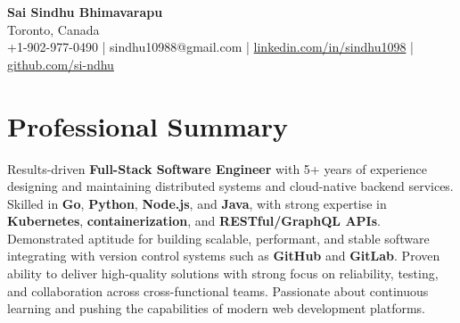 \documentclass[letterpaper,11pt]{article}
\begin{document}
\begin{center}
  {\Large \textbf{Sai Sindhu Bhimavarapu}} \\
  Toronto, Canada \\
  +1-902-977-0490 \enspace | \enspace sindhu10988@gmail.com \enspace | \enspace \href{https://www.linkedin.com/in/sindhu1098/}{linkedin.com/in/sindhu1098} \enspace | \enspace \href{https://github.com/si-ndhu}{github.com/si-ndhu}
\end{center}

\section{Professional Summary}
  \begin{itemize}[leftmargin=0.15in, label={}]
    \small{\item{
     Results-driven \textbf{Full-Stack Software Engineer} with 5+ years of experience designing and maintaining distributed systems and cloud-native backend services. Skilled in \textbf{Go}, \textbf{Python}, \textbf{Node.js}, and \textbf{Java}, with strong expertise in \textbf{Kubernetes}, \textbf{containerization}, and \textbf{RESTful/GraphQL APIs}. Demonstrated aptitude for building scalable, performant, and stable software integrating with version control systems such as \textbf{GitHub} and \textbf{GitLab}. Proven ability to deliver high-quality solutions with strong focus on reliability, testing, and collaboration across cross-functional teams. Passionate about continuous learning and pushing the capabilities of modern web development platforms.
    }}
  \end{itemize}
\vspace{-16pt}

\end{document}

